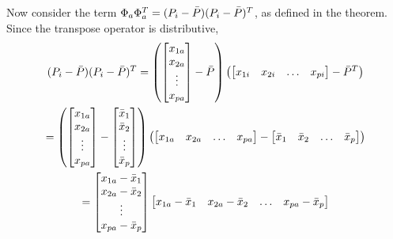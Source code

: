 \documentclass[12pt]{report}
\begin{document}
\begin{myproof}
                Now consider the term $\Phi_a \Phi_a^T = (P_i - \bar{P})(P_i - \bar{P})^T$, as defined in the theorem. Since the transpose operator is distributive,
                \begin{gather*}
                    (P_i - \bar{P})(P_i - \bar{P})^{T} =
                        \left(
                            \begin{bmatrix}
                                x_{1a} \\
                                x_{2a} \\
                                \vdots \\
                                x_{pa}
                            \end{bmatrix} - \bar{P}
                        \right)
                        \left(
                            \begin{bmatrix}
                                x_{1i} & x_{2i} & \dotsc & x_{pi}
                            \end{bmatrix} - \bar{P}^T
                        \right)
                    \\
                    = \left(
                        \begin{bmatrix}
                            x_{1a} \\
                            x_{2a} \\
                            \vdots \\
                            x_{pa}
                        \end{bmatrix} - \begin{bmatrix}
                            \bar{x}_1 \\
                            \bar{x}_2 \\
                            \vdots \\
                            \bar{x}_p
                        \end{bmatrix}
                    \right)
                    \left(
                        \begin{bmatrix}
                            x_{1a} & x_{2a} & \dotsc & x_{pa}
                        \end{bmatrix} - \begin{bmatrix}
                            \bar{x}_1 & \bar{x}_2 & \dotsc & \bar{x}_p
                        \end{bmatrix}
                    \right)
                    \\
                    = \begin{bmatrix}
                        x_{1a} - \bar{x}_1 \\
                        x_{2a} - \bar{x}_2 \\
                        \vdots \\
                        x_{pa} - \bar{x}_p
                    \end{bmatrix} \begin{bmatrix}
                        x_{1a} - \bar{x}_1 & x_{2a} - \bar{x}_2 & \dotsc & x_{pa} - \bar{x}_p
                    \end{bmatrix}
                \end{gather*}


\end{myproof}
\end{document}
